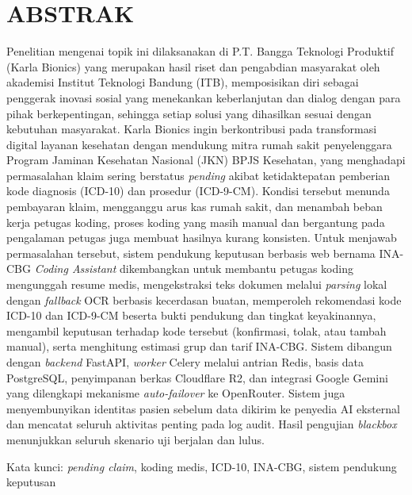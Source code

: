 \chapter*{ABSTRAK}

Penelitian mengenai topik ini dilaksanakan di P.T. Bangga Teknologi Produktif (Karla Bionics) yang merupakan hasil riset dan pengabdian masyarakat oleh akademisi Institut Teknologi Bandung (ITB), memposisikan diri sebagai penggerak inovasi sosial yang menekankan keberlanjutan dan dialog dengan para pihak berkepentingan, sehingga setiap solusi yang dihasilkan sesuai dengan kebutuhan masyarakat. Karla Bionics ingin berkontribusi pada transformasi digital layanan kesehatan dengan mendukung mitra rumah sakit penyelenggara Program Jaminan Kesehatan Nasional (JKN) BPJS Kesehatan, yang menghadapi permasalahan klaim sering berstatus \textit{pending} akibat ketidaktepatan pemberian kode diagnosis (ICD-10) dan prosedur (ICD-9-CM). Kondisi tersebut menunda pembayaran klaim, mengganggu arus kas rumah sakit, dan menambah beban kerja petugas koding, proses koding yang masih manual dan bergantung pada pengalaman petugas juga membuat hasilnya kurang konsisten. Untuk menjawab permasalahan tersebut, sistem pendukung keputusan berbasis web bernama INA-CBG \textit{Coding Assistant} dikembangkan untuk membantu petugas koding mengunggah resume medis, mengekstraksi teks dokumen melalui \textit{parsing} lokal dengan \textit{fallback} OCR berbasis kecerdasan buatan, memperoleh rekomendasi kode ICD-10 dan ICD-9-CM beserta bukti pendukung dan tingkat keyakinannya, mengambil keputusan terhadap kode tersebut (konfirmasi, tolak, atau tambah manual), serta menghitung estimasi grup dan tarif INA-CBG. Sistem dibangun dengan \textit{backend} FastAPI, \textit{worker} Celery melalui antrian Redis, basis data PostgreSQL, penyimpanan berkas Cloudflare R2, dan integrasi Google Gemini yang dilengkapi mekanisme \textit{auto-failover} ke OpenRouter. Sistem juga menyembunyikan identitas pasien sebelum data dikirim ke penyedia AI eksternal dan mencatat seluruh aktivitas penting pada log audit. Hasil pengujian \textit{blackbox} menunjukkan seluruh skenario uji berjalan dan lulus.

\vspace{12pt}
\noindent Kata kunci: \textit{pending claim}, koding medis, ICD-10, INA-CBG, sistem pendukung keputusan
